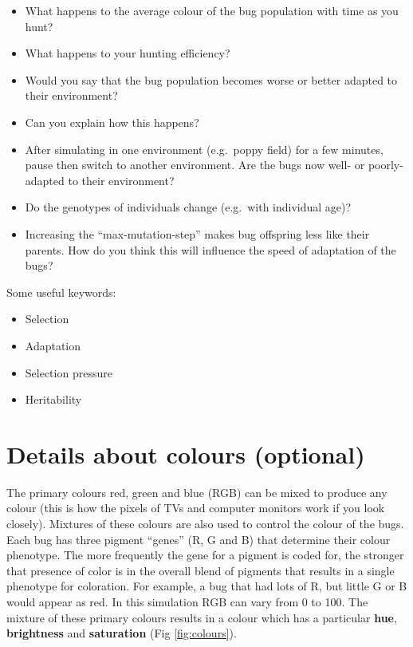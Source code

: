 \documentclass[
  a4paper]{book}
\providecommand{\tightlist}{%
  \setlength{\itemsep}{0pt}\setlength{\parskip}{0pt}}
\begin{document}
\begin{itemize}
\tightlist
\item
  What happens to the average colour of the bug population with time as you hunt?
\item
  What happens to your hunting efficiency?
\item
  Would you say that the bug population becomes worse or better adapted to their environment?
\item
  Can you explain how this happens?
\item
  After simulating in one environment (e.g.~poppy field) for a few minutes, pause then switch to another environment. Are the bugs now well- or poorly-adapted to their environment?
\item
  Do the genotypes of individuals change (e.g.~with individual age)?
\item
  Increasing the ``max-mutation-step'' makes bug offspring less like their parents. How do you think this will influence the speed of adaptation of the bugs?
\end{itemize}

Some useful keywords:

\begin{itemize}
\tightlist
\item
  Selection
\item
  Adaptation
\item
  Selection pressure
\item
  Heritability
\end{itemize}

\section{Details about colours (optional)}\label{details-about-colours-optional}

The primary colours red, green and blue (RGB) can be mixed to produce any colour (this is how the pixels of TVs and computer monitors work if you look closely). Mixtures of these colours are also used to control the colour of the bugs. Each bug has three pigment ``genes'' (R, G and B) that determine their colour phenotype. The more frequently the gene for a pigment is coded for, the stronger that presence of color is in the overall blend of pigments that results in a single phenotype for coloration. For example, a bug that had lots of R, but little G or B would appear as red. In this simulation RGB can vary from 0 to 100. The mixture of these primary colours results in a colour which has a particular \textbf{hue}, \textbf{brightness} and \textbf{saturation} (Fig \ref{fig:colours}).
\end{document}

